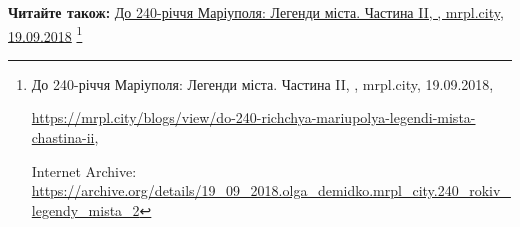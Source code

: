  
 
 
 
 

\def\pubIA{https://archive.org/details/19_09_2018.olga_demidko.mrpl_city.240_rokiv_legendy_mista_2}
\def\pubTitle{До 240-річчя Маріуполя: Легенди міста. Частина II}
\def\pubDate{19.09.2018}
\def\pubOrigin{https://mrpl.city/blogs/view/do-240-richchya-mariupolya-legendi-mista-chastina-ii}
\def\pubAuthor{\pubAuthorDemidko}
\def\pubSite{mrpl.city}

\textbf{Читайте також:} \href{\pubIA}{%
\pubTitle, \pubAuthor, \pubSite, \pubDate}%
\footnote{\pubTitle, \pubAuthor, \pubSite, \pubDate, \par\url{\pubOrigin}, \par Internet Archive: \url{\pubIA}}


